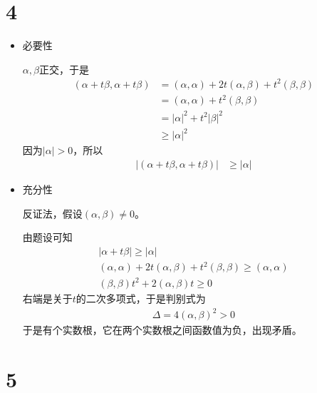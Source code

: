 \documentclass{article}
\begin{document}
\section*{4}

\begin{itemize}
  \item 必要性

        $\alpha, \beta$正交，于是
        \begin{align*}
          (\alpha + t \beta, \alpha + t \beta)
           & = (\alpha, \alpha) + 2t(\alpha, \beta) + t^2 (\beta, \beta) \\
           & = (\alpha, \alpha) + t^2 (\beta, \beta)                     \\
           & = |\alpha|^2 + t^2 |\beta|^2                                \\
           & \geq |\alpha|^2
        \end{align*}
        因为$|\alpha|> 0$，所以
        \begin{align*}
          |(\alpha + t \beta, \alpha + t \beta)| & \geq |\alpha|
        \end{align*}

  \item 充分性

        反证法，假设$(\alpha, \beta) \neq 0$。

        由题设可知
        \begin{align*}
          |\alpha + t \beta| \geq |\alpha|                                                \\
          (\alpha, \alpha) + 2t(\alpha, \beta) + t^2 (\beta, \beta) \geq (\alpha, \alpha) \\
          (\beta, \beta) t^2 + 2(\alpha, \beta) t \geq 0
        \end{align*}
        右端是关于$t$的二次多项式，于是判别式为
        \begin{align*}
          \Delta = 4(\alpha, \beta)^2 > 0
        \end{align*}
        于是有个实数根，它在两个实数根之间函数值为负，出现矛盾。

\end{itemize}

\section*{5}
\end{document}
